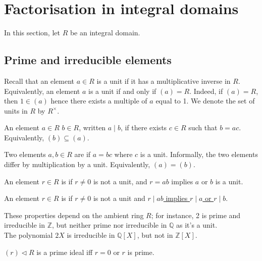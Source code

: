 \section{Factorisation in integral domains}

In this section, let $R$ be an integral domain.

\subsection{Prime and irreducible elements}
Recall that an element $a \in R$ is a unit if it has a multiplicative inverse in $R$.
Equivalently, an element $a$ is a unit if and only if $(a) = R$.
Indeed, if $(a) = R$, then $1 \in (a)$ hence there exists a multiple of $a$ equal to 1.
We denote the set of units in $R$ by $R^\times$.

\begin{definition}[Divides]
	An element $a \in R$  $b \in R$, written $a \mid b$, if there exists $c \in R$ such that $b = ac$.
	Equivalently, $(b) \subseteq (a)$.
\end{definition}

\begin{definition}[Associates]
	Two elements $a, b \in R$ are  if $a = bc$ where $c$ is a unit.
	Informally, the two elements differ by multiplication by a unit.
	Equivalently, $(a) = (b)$.
\end{definition}

\begin{definition}[Irreducible]
	An element $r \in R$ is  if $r \neq 0$ is not a unit, and $r = ab$ implies $a$ or $b$ is a unit.
\end{definition}

\begin{definition}[Prime]
	An element $r \in R$ is  if $r \neq 0$ is not a unit and \underline{$r \mid ab$ implies $r \mid a$ or $r \mid b$}.
\end{definition}

\begin{remark}
	These properties depend on the ambient ring $R$; for instance, 2 is prime and irreducible in $\mathbb Z$, but neither prime nor irreducible in $\mathbb Q$ as it's a unit. \\
	The polynomial $2X$ is irreducible in $\mathbb Q[X]$, but not in $\mathbb Z[X]$.
\end{remark}

\begin{lemma} \label{lem:10.1}
	$(r) \triangleleft R$ is a prime ideal iff $r = 0$ or $r$ is prime.
\end{lemma}

